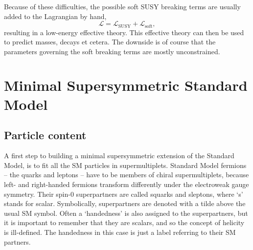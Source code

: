 Because of these difficulties, the possible soft SUSY breaking terms are usually added to the
Lagrangian by hand, 
\begin{equation}
  \mathcal{L} = \mathcal{L}_{\text{SUSY}} + \mathcal{L}_{\text{soft}},
  \label{eq:L_general}
\end{equation}
resulting in a low-energy effective theory. This effective theory can then be
used to predict masses, decays et cetera. The downside is of course that the parameters governing
the soft breaking terms are mostly unconstrained. 


\section{Minimal Supersymmetric Standard Model \label{sec:susy_MSSM}}

\subsection{Particle content \label{sec:susy_MSSM_particles}}

A first step to building a minimal supersymmetric extension of the Standard Model, is to fit all the
SM particles in supermultiplets. 
Standard Model fermions -- the quarks and leptons -- have to be members of chiral supermultiplets,
because left- and right-handed fermions transform differently under the electroweak gauge symmetry.
Their spin-0 superpartners are called squarks and sleptons, where `s' stands for scalar.
Symbolically, superpartners are denoted with a tilde above the usual SM symbol. 
Often a `handedness' is also assigned to the superpartners, but it is important to remember that
they are scalars, and so the concept of helicity is ill-defined. The handedness in this case is
just a label referring to their SM partners. 

